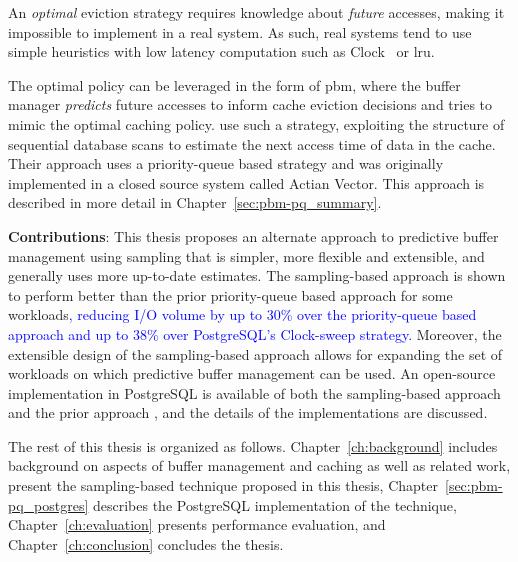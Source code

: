 An \textit{optimal} eviction strategy requires knowledge about \textit{future} accesses, making it impossible to implement in a real system. As such, real systems tend to use simple heuristics with low latency computation such as Clock~\cite{gclock} or \gls{lru}.

The optimal policy can be leveraged in the form of \gls{pbm}, where the buffer manager \textit{predicts} future accesses to inform cache eviction decisions and tries to mimic the optimal caching policy. \citet{pbm} use such a strategy, exploiting the structure of sequential database scans to estimate the next access time of data in the cache. Their approach uses a priority-queue based strategy and was originally implemented in a closed source system called Actian Vector. This approach is described in more detail in Chapter~\ref{sec:pbm-pq_summary}.

\textbf{Contributions}: This thesis proposes an alternate approach to predictive buffer management using sampling that is simpler, more flexible and extensible, and generally uses more up-to-date estimates. The sampling-based approach is shown to perform better than the prior priority-queue based approach for some workloads\textcolor{blue}{, reducing I/O volume by up to 30\% over the priority-queue based approach and up to 38\% over PostgreSQL's Clock-sweep strategy.} Moreover, the extensible design of the sampling-based approach allows for expanding the set of workloads on which predictive buffer management can be used. An open-source implementation in PostgreSQL is available of both the sampling-based approach and the prior approach \cite{pbm}, and the details of the implementations are discussed.

The rest of this thesis is organized as follows. Chapter~\ref{ch:background} includes background on aspects of buffer management and caching as well as related work,  present the sampling-based technique proposed in this thesis, Chapter~\ref{sec:pbm-pq_postgres} describes the PostgreSQL implementation of the technique, Chapter~\ref{ch:evaluation} presents performance evaluation, and Chapter~\ref{ch:conclusion} concludes the thesis.